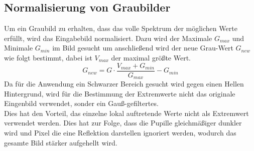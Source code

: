 \subsection{Normalisierung von Graubilder}
Um ein Graubild zu erhalten, dass das volle Spektrum der möglichen Werte erfüllt, wird das Eingabebild normalisiert. Dazu wird der Maximale $G_{max}$ und Minimale $G_{min}$ im Bild gesucht um anschließend wird der neue Grau-Wert $G_{new}$ wie folgt bestimmt, dabei ist $V_{max}$ der maximal größte Wert.
\[G_{new} = G\cdot \dfrac{V_{max}+G_{min}}{G_{max}}-G_{min}\]
Da für die Anwendung ein Schwarzer Bereich gesucht wird gegen einen Hellen Hintergrund, wird für die Bestimmung der Extremwerte nicht das originale Eingenbild verwendet, sonder ein Gauß-gefiltertes.\\
Dies hat den Vorteil, das einzelne lokal auftretende Werte nicht als Extremwert verwendet werden. Dies hat zur Folge, dass die Pupille gleichmäßiger dunkler wird und Pixel die eine Reflektion darstellen ignoriert werden, wodurch das gesamte Bild stärker aufgehellt wird.
